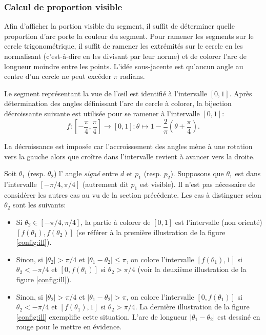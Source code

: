 \subsubsection*{Calcul de proportion visible}
Afin d'afficher la portion visible du segment,
il suffit de déterminer quelle proportion d'arc  porte la couleur du segment.
Pour ramener les segments sur le cercle trigonométrique, il suffit
de ramener les extrémités sur le cercle en les normalisant (c'est-à-dire en
les divisant par leur norme) et
de colorer l'arc de longueur moindre entre les points.
L'idée sous-jacente est qu'aucun angle au centre d'un cercle ne
peut excéder $\pi$ radians.


Le segment représentant la vue de l'\oe{}il est identifié à l'intervalle
$[0, 1]$. Après détermination des angles définissant l'arc de cercle
à colorer, la bijection décroissante suivante est utilisée pour
se ramener à l'intervalle $[0, 1]$:
$$f:\left[-\frac{\pi}{4}, \frac{\pi}{4}\right]\to [0, 1]: \theta \mapsto 1 - \frac{2}{\pi}\left(\theta + \frac{\pi}{4}\right).$$

La décroissance est imposée car l'accroissement des angles mène
à une rotation vers la gauche alors que croître dans l'intervalle
revient à avancer vers la droite.

Soit $\theta_1$  (resp. $\theta_2$) l' angle \emph{signé}
entre $d$ et $p_1$ (resp. $p_2$).
Supposons que $\theta_1$ est dans l'intervalle $[-\pi/4, \pi/4]$
(autrement dit $p_1$ est visible). Il n'est pas nécessaire de considérer
les autres cas au vu de la section précédente. Les cas à distinguer selon
$\theta_2$ sont les suivants:

\begin{itemize}
  \item Si $\theta_2\in[-\pi/4, \pi/4]$, la partie à colorer de $[0, 1]$ est
    l'intervalle (non orienté) $[f(\theta_1), f(\theta_2)]$
    (se référer à la première illustration de la figure \ref{config:ill}).
  \item Sinon, si $|\theta_2|>\pi/4$ et $|\theta_1-\theta_2|\leq \pi$,
    on colore l'intervalle $[f(\theta_1), 1]$ si $\theta_2<-\pi/4$ et
    $[0, f(\theta_1)]$ si $\theta_2>\pi/4$
    (voir la deuxième illustration de la figure \ref{config:ill}).
  \item Sinon, si $|\theta_2|>\pi/4$ et $|\theta_1-\theta_2|> \pi$,
    on colore l'intervalle $[0, f(\theta_1)]$ si $\theta_2<-\pi/4$ et
    $[f(\theta_1), 1]$ si $\theta_2>\pi/4$. La dernière illustration
    de la figure \ref{config:ill} exemplifie cette situation. L'arc
    de longueur $|\theta_1-\theta_2|$ est dessiné en rouge
    pour le mettre en évidence.
\end{itemize}

